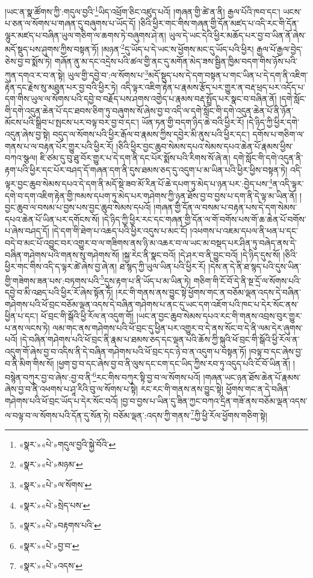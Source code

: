 །ཡང་ན་སྣ་ཚོགས་ཀྱི་:གདུལ་བྱའི་\footnote{«སྣར་»«པེ་»གདུལ་བྱའི་སྐྱེ་བོའི་}ཡིད་འཕྲོག་ཅིང་འཛུད་པའོ། །གཞན་གྱི་ཚེ་ན་ནི། རྒྱལ་པོའི་ཁབ་དང་། ཡངས་པ་ཅན་ལ་སོགས་པ་གཞན་དུ་བཞུགས་པ་ཡོད་དོ། །ཅིའི་ཕྱིར་གང་གིས་གཞན་གྱི་དོན་མཛད་པ་འདི་རང་གི་དོན་ལྷུར་མཛད་པ་བཞིན་ཡུལ་གཅིག་ལ་ཆགས་ཏེ་བཞུགས་ཤེ་ན། ཡུལ་དེ་ཡང་དེའི་ཕྱིར་མཆོད་པར་བྱ་བ་ཡིན་ནོ་ཞེས་མདོ་སྡུད་པས་ཤུགས་ཀྱིས་བསྟན་ཏོ། །མཉན་\footnote{«སྣར་»«པེ་»མཉམ་}དུ་ཡོད་པ་དེ་ཡང་ས་ཕྱོགས་མང་དུ་ཡོད་པའི་ཕྱིར། རྒྱལ་པོ་རྒྱལ་བྱེད་ཅེས་བྱ་བ་སྨོས་ཏེ། གཞོན་ནུ་མ་དང་འདྲེས་པའི་ཚལ་གྱི་ནང་དུ་མགོན་མེད་ཟས་སྦྱིན་ཁྱིམ་བདག་གིས་ཉོས་པའི་ཀུན་དགའ་ར་བ་ན་སྟེ། ཡུལ་གྱི་དབྱེ་བ་:ལ་སོགས་པ་\footnote{«སྣར་»«པེ་»ལ་སོགས་}མདོ་སྡུད་པས་དེ་དག་བསྟན་པ་གང་ཡིན་པ་དེ་དག་ནི་འཇིག་རྟེན་དང་རྗེས་སུ་མཐུན་པར་བྱ་བའི་ཕྱིར་ཏེ། འདི་ལྟར་འཇིག་རྟེན་པ་རྣམས་རྩོད་པར་གྱུར་ན་བརྡ་ཕྲད་པར་འདོད་པ་དག་གིས་ཡུལ་ལ་སོགས་པའི་དབྱེ་བ་བརྗོད་པས་ཤགས་འགྱེད་པ་རྣམས་བརྡ་སྤྲོད་པར་སྣང་བ་བཞིན་ནོ། །དགེ་སློང་གི་དགེ་འདུན་ཆེན་པོ་དང་ཐབས་ཅིག་ཏུ་བཞུགས་སོ་ཞེས་བྱ་བ་འདི་ལ་དགེ་སློང་གི་དགེ་འདུན་ཆེན་པོ་ནི་ཉོན་མོངས་པའི་སྒྲིབ་པ་སྤངས་པར་བལྟ་བར་བྱ་བ་དང་། ཡོན་ཏན་གྱི་བདག་ཉིད་ཆེ་བའི་ཕྱིར་རོ། །དེ་ཉིད་ཀྱི་ཕྱིར་དགེ་འདུན་ཞེས་བྱ་སྟེ། བདུད་ལ་སོགས་པའི་ཕྱིར་རྒོལ་བ་རྣམས་ཀྱིས་དབྱེར་མི་ནུས་པའི་ཕྱིར་དང་། དགོས་པ་གཅིག་ལ་གནས་པ་ལ་བརྟན་པོར་གྱུར་པའི་ཕྱིར་རོ། །ཅིའི་ཕྱིར་བྱང་ཆུབ་སེམས་དཔའ་སེམས་དཔའ་ཆེན་པོ་རྣམས་ཕྱིས་བཀའ་སྩལ། ཇི་ཙམ་དུ་བུ་ཐུ་བོར་གྱུར་པ་དེ་དག་ནི་དང་པོར་སྨོས་པའི་རིགས་སོ་ཞེ་ན། དགེ་སློང་གི་དགེ་འདུན་ནི་རྟག་པའི་ཕྱིར་དང་པོར་བཤད་དོ་གཞན་དག་ནི་དུས་ཐམས་ཅད་དུ་འདུག་པ་མ་ཡིན་པའི་ཕྱིར་ཕྱིས་བསྟན་ཏེ། འདི་ལྟར་བྱང་ཆུབ་སེམས་དཔའ་དེ་དག་ནི་མདོ་སྡེ་ཟབ་མོ་རིན་པོ་ཆེ་དཔག་ཏུ་མེད་པ་ཉན་པར་:བྱེད་པས་\footnote{«སྣར་»«པེ་»སྲེད་པས་}ན་འདི་ལྟར་དགེ་བ་དག་འཇིག་རྟེན་གྱི་ཁམས་དཔག་ཏུ་མེད་པར་གཤེགས་ཀྱི་ཉན་ཐོས་བྱ་བ་བྱས་པ་དག་ནི་དེ་ལྟ་མ་ཡིན་ནོ། །བྱང་ཆུབ་ལ་བསམ་པ་བྱས་པས་བྱང་ཆུབ་སེམས་དཔའོ། །གཞན་གྱི་དོན་ལ་བསམ་པ་བརྟན་པས་དེ་དག་སེམས་དཔའ་ཆེན་པོ་ཡིན་པར་དགོངས་སོ། །དེ་ཉིད་ཀྱི་ཕྱིར་རང་དང་གཞན་གྱི་དོན་ལ་གོ་བགོས་པས་གོ་ཆ་ཆེན་པོ་བགོས་པ་ཞེས་བཤད་དོ། །དེ་དག་གི་ཐེག་པ་འཆད་པའི་ཕྱིར་འདུས་པ་མང་ངོ། །འཕགས་པ་འཇམ་དཔལ་ནི་ཕན་པ་དང་བདེ་བ་མང་པོ་འབྱུང་བར་འགྱུར་བ་ལ་གཟིགས་ནས་ཉི་མ་འཆར་བ་ལ་ཡང་མ་བསྡད་པར་ཤིན་ཏུ་བཞེད་ནས་དེ་བཞིན་གཤེགས་པའི་གནས་སུ་གཤེགས་སོ། །སྐྱ་རེང་ནི་སྣང་བའོ། །དེ་ཤར་བ་ནི་བྱུང་བའོ། །དེ་ཉིད་དུས་སོ། །ཅིའི་ཕྱིར་གང་གིས་འདི་ད་ལྟར་ཚེ་ཞེས་བྱ་ཞེ་ན། ཐ་སྙད་ཀྱི་ཡུལ་ཡིན་པའི་ཕྱིར་རོ། །དེས་ན་དེ་ནི་ཐ་སྙད་པའི་དུས་ཡིན་གྱི་གཟེགས་ཟན་པས་:བཏགས་པའི་\footnote{«སྣར་»«པེ་»བརྟགས་པའི་}དུས་རྟག་པ་ནི་ཡོད་པ་མ་ཡིན་ཏེ། གཅིག་གི་ངོ་བོ་དེ་ནི་སྔ་དྲོ་ལ་སོགས་པའི་དབྱེ་བ་མི་འཐད་པའི་ཕྱིར་རོ་ཞེས་སྟོན་ཏོ། །རང་གི་གནས་ནས་བྱུང་སྟེ་ཕྱོགས་གང་ན་བཅོམ་ལྡན་འདས་དེ་བཞིན་གཤེགས་པའི་ཕོ་བྲང་བཅོམ་ལྡན་འདས་དེ་བཞིན་གཤེགས་པ་ནང་དུ་ཡང་དག་འཇོག་པའི་ཁང་པ་དེར་སོང་ནས་ཕྱིན་པ་དང་། ཕོ་བྲང་གི་སྒོའི་ཕྱི་རོལ་ན་འདུག་གོ། །ཡང་ན་བྱང་ཆུབ་སེམས་དཔའ་རང་གི་གནས་འབྲས་བུར་གྱུར་པ་ནས་ལངས་ཏེ། ལམ་གང་ནས་གཤེགས་པའི་ཕོ་བྲང་དུ་ཕྱིན་པར་འགྱུར་བ་དེ་ནས་སོང་བ་དེ་ནི་ལམ་དེར་ཞུགས་པའོ། །དེ་བཞིན་གཤེགས་པའི་ཕོ་བྲང་ནི་རྣམ་པ་ཐམས་ཅད་དང་ལྡན་པའི་ཆོས་ཀྱི་སྐུའི་ཕོ་བྲང་གི་སྒོའི་ཕྱི་རོལ་ན་འདུག་གོ་ཞེས་བྱ་བ་འདིས་ནི་དེ་བཞིན་གཤེགས་པའི་ཕོ་བྲང་དང་ཉེ་བ་ན་འདུག་པ་བསྟན་ཏོ། །བལྟ་བ་དང་ཞེས་བྱ་བ་ནི་མིག་གིས་སོ། །ཕྱག་བྱ་བ་དང་ཞེས་བྱ་བ་ནི་ལུས་དང་ངག་དང་ཡིད་ཀྱིས་རབ་ཏུ་འདུད་པའི་ངོ་བོ་ཡིན་ནོ། །བསྙེན་བཀུར་བྱ་བ་ཞེས་:བྱ་བ་ནི་\footnote{«སྣར་»«པེ་»བྱ་བ་}རང་གིས་བཀུར་སྟི་བྱ་བ་ལ་སོགས་པའོ། །གཞན་ཡང་ཉན་ཐོས་ཆེན་པོ་རྣམས་ཞེས་བྱ་བ་ནི་འཕགས་པ་ཤཱ་རིའི་བུ་ལ་སོགས་པ་སྟེ། རང་རང་གི་གནས་ནས་བྱུང་སྟེ། ཕྱོགས་གང་ན་དེ་བཞིན་གཤེགས་པའི་ཕོ་བྲང་ཡོད་པ་དེར་སོང་བའོ། །བྱ་བ་བྱས་པ་ཡིན་དུ་ཟིན་ཀྱང་བཀའ་དྲིན་གཟོ་ནས་བཅོམ་ལྡན་འདས་ལ་བལྟ་བ་ལ་སོགས་པའི་དོན་དུ་སོན་ཏེ། བཅོམ་ལྡན་:འདས་ཀྱི་གནས་\footnote{«སྣར་»«པེ་»འདས་}ཀྱི་ཕྱི་རོལ་ཕྱོགས་གཅིག་སྟེ། 